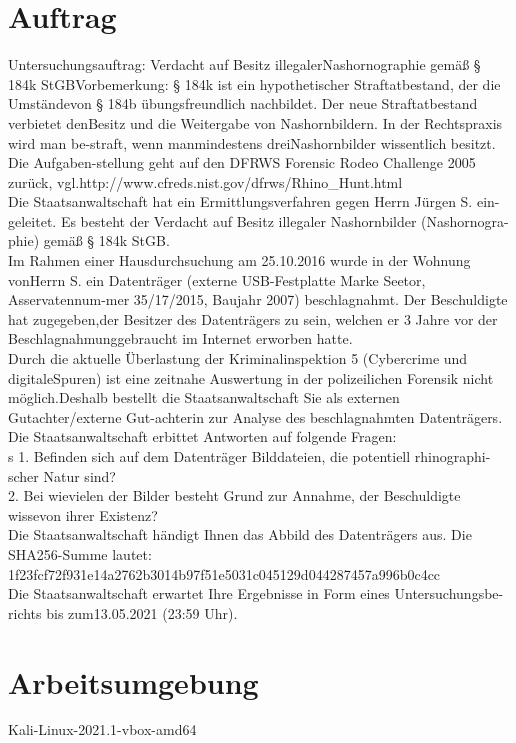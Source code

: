 \section{Auftrag}
Untersuchungsauftrag: Verdacht auf Besitz illegalerNashornographie gemäß § 184k StGBVorbemerkung: § 184k ist ein hypothetischer Straftatbestand, der die Umständevon § 184b übungsfreundlich nachbildet. Der neue Straftatbestand verbietet denBesitz und die Weitergabe von Nashornbildern. In der Rechtspraxis wird man be-straft, wenn manmindestens dreiNashornbilder wissentlich besitzt. Die Aufgaben-stellung geht auf den DFRWS Forensic Rodeo Challenge 2005 zurück, vgl.http://www.cfreds.nist.gov/dfrws/Rhino_Hunt.html\\
Die Staatsanwaltschaft hat ein Ermittlungsverfahren gegen Herrn Jürgen S. ein-geleitet. Es besteht der Verdacht auf Besitz illegaler Nashornbilder (Nashornogra-phie) gemäß § 184k StGB.\\
Im Rahmen einer Hausdurchsuchung am 25.10.2016 wurde in der Wohnung vonHerrn S. ein Datenträger (externe USB-Festplatte Marke Seetor, Asservatennum-mer 35/17/2015, Baujahr 2007) beschlagnahmt. Der Beschuldigte hat zugegeben,der Besitzer des Datenträgers zu sein, welchen er 3 Jahre vor der Beschlagnahmunggebraucht im Internet erworben hatte.\\
Durch die aktuelle Überlastung der Kriminalinspektion 5 (Cybercrime und digitaleSpuren) ist eine zeitnahe Auswertung in der polizeilichen Forensik nicht möglich.Deshalb bestellt die Staatsanwaltschaft Sie als externen Gutachter/externe Gut-achterin zur Analyse des beschlagnahmten Datenträgers.\\
Die Staatsanwaltschaft erbittet Antworten auf folgende Fragen:\\s
1. Befinden sich auf dem Datenträger Bilddateien, die potentiell rhinographi-scher Natur sind?\\
2. Bei wievielen der Bilder besteht Grund zur Annahme, der Beschuldigte wissevon ihrer Existenz?\\
Die Staatsanwaltschaft händigt Ihnen das Abbild des Datenträgers aus. Die SHA256-Summe lautet:\\ 1f23fcf72f931e14a2762b3014b97f51e5031c045129d044287457a996b0c4cc\\
Die Staatsanwaltschaft erwartet Ihre Ergebnisse in Form eines Untersuchungsbe-richts bis zum13.05.2021 (23:59 Uhr).

\section{Arbeitsumgebung}

Kali-Linux-2021.1-vbox-amd64